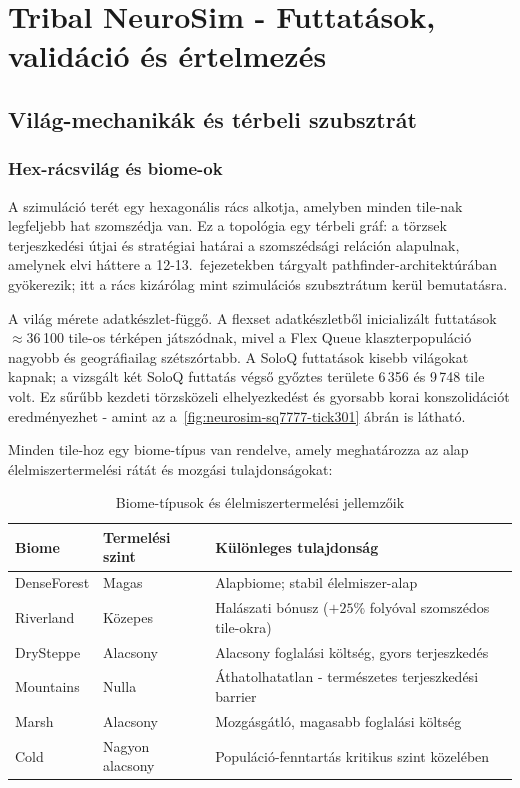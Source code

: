 \chapter{Tribal NeuroSim - Futtatások, validáció és értelmezés}

\section{Világ-mechanikák és térbeli szubsztrát}
\label{sec:neurosim-26-mechanics}

\subsection*{Hex-rácsvilág és biome-ok}

A szimuláció terét egy hexagonális rács alkotja, amelyben minden tile-nak legfeljebb hat szomszédja van. Ez a topológia egy térbeli gráf: a törzsek terjeszkedési útjai és stratégiai határai a szomszédsági reláción alapulnak, amelynek elvi háttere a 12-13.~fejezetekben tárgyalt pathfinder-architektúrában gyökerezik; itt a rács kizárólag mint szimulációs szubsztrátum kerül bemutatásra.

A világ mérete adatkészlet-függő. A flexset adatkészletből inicializált futtatások $\approx$36\,100 tile-os térképen játszódnak, mivel a Flex Queue klaszterpopuláció nagyobb és geográfiailag szétszórtabb. A SoloQ futtatások kisebb világokat kapnak; a vizsgált két SoloQ futtatás végső győztes területe 6\,356 és 9\,748 tile volt. Ez sűrűbb kezdeti törzsközeli elhelyezkedést és gyorsabb korai konszolidációt eredményezhet - amint az a~\ref{fig:neurosim-sq7777-tick301} ábrán is látható.

Minden tile-hoz egy biome-típus van rendelve, amely meghatározza az alap élelmiszertermelési rátát és mozgási tulajdonságokat:

\begin{table}[h]
\centering
\caption{Biome-típusok és élelmiszertermelési jellemzőik}
\label{tab:biomes}
\begin{tabular}{lll}
\hline
\textbf{Biome} & \textbf{Termelési szint} & \textbf{Különleges tulajdonság} \\
\hline
DenseForest & Magas        & Alapbiome; stabil élelmiszer-alap \\
Riverland   & Közepes      & Halászati bónusz ($+25\%$ folyóval szomszédos tile-okra) \\
DrySteppe   & Alacsony     & Alacsony foglalási költség, gyors terjeszkedés \\
Mountains   & Nulla        & Áthatolhatatlan - természetes terjeszkedési barrier \\
Marsh       & Alacsony     & Mozgásgátló, magasabb foglalási költség \\
Cold        & Nagyon alacsony & Populáció-fenntartás kritikus szint közelében \\
\hline
\end{tabular}
\end{table}

